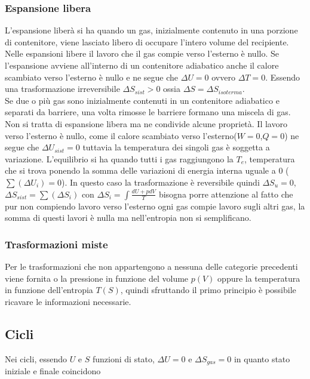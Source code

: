 \documentclass{article}
\begin{document}
\subsubsection*{Espansione libera}
L'espansione liberà si ha quando un gas, inizialmente contenuto in una porzione di contenitore, viene lasciato libero di occupare l'intero volume del recipiente.
Nelle espansioni libere il lavoro che il gas compie verso l'esterno è nullo. Se l'espansione avviene all'interno di un contenitore adiabatico anche il calore scambiato verso l'esterno è nullo e ne segue che $\Delta U=0$ ovvero $\Delta T=0$. Essendo una trasformazione irreversibile $\Delta S_{sist}>0$ ossia $\Delta S=\Delta S_{isoterma}$.
\\Se due o più gas sono inizialmente contenuti in un contenitore adiabatico e separati da barriere, una volta rimosse le barriere formano una miscela di gas. Non si tratta di espansione libera ma ne condivide alcune proprietà. Il lavoro verso l'esterno è nullo, come il calore scambiato verso l'esterno($W=0$,$Q=0$) ne segue che $\Delta U_{sist}=0$ tuttavia la temperatura dei singoli gas è soggetta a variazione. L'equilibrio si ha quando tutti i gas raggiungono la $T_e$, temperatura che si trova ponendo la somma delle variazioni di energia interna uguale a 0 ($\sum (\Delta U_i)=0$). In questo caso la trasformazione è reversibile quindi $\Delta S_u=0$, $\Delta S_{sist}=\sum(\Delta S_i)$ con $\Delta S_i=\int \frac{dU+pdV}{T}$ bisogna porre attenzione al fatto che pur non compiendo lavoro verso l'esterno ogni gas compie lavoro sugli altri gas, la somma di questi lavori è nulla ma nell'entropia non si semplificano.


\subsubsection*{Trasformazioni miste}
Per le trasformazioni che non appartengono a nessuna delle categorie precedenti viene fornita o la pressione in funzione del volume $p(V)$ oppure la temperatura in funzione dell'entropia $T(S)$, quindi sfruttando il primo principio è possibile ricavare le informazioni necessarie. 
\subsection*{Cicli}
Nei cicli, essendo $U$ e $S$ funzioni di stato, $\Delta U=0$ e $\Delta S_{gas}=0$ in quanto stato iniziale e finale coincidono
\end{document}
